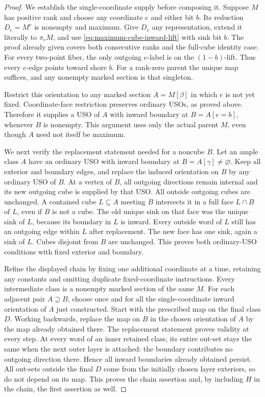 \begin{proof}
We establish the single-coordinate supply before composing it. Suppose
$M$ has positive rank and choose any coordinate $e$ and either bit $b$.
Its reduction $D_e=M^e$ is nonempty and maximum. Give $D_e$ any
representation, extend it literally to $\pi_eM$, and use
\eqref{eq:maximum-cube-inward-lift} with sink bit $b$. The proof already
given covers both consecutive ranks and the full-cube identity case.
For every two-point fiber, the only outgoing $e$-label is on the
$(1-b)$-lift. Thus every $e$-edge points toward shore $b$.
For a rank-zero parent the unique map suffices, and any nonempty marked
section is that singleton.

Restrict this orientation to any marked section $A=M[\beta]$ in which
$e$ is not yet fixed. Coordinate-face restriction preserves ordinary
USOs, as proved above. Therefore it supplies a USO of $A$ with inward
boundary at $B=A[e=b]$, whenever $B$ is nonempty. This argument uses
only the actual parent $M$, even though $A$ need not itself be maximum.

We next verify the replacement statement needed for a noncube $B$.
Let an ample class $A$ have an ordinary USO with inward boundary at
$B=A[\gamma]\ne\varnothing$. Keep all exterior and boundary edges,
and replace the induced orientation on $B$ by any ordinary USO of $B$.
At a vertex of $B$, all outgoing directions remain internal and its
new outgoing cube is supplied by that USO. All outside outgoing cubes
are unchanged. A contained cube $L\subseteq A$ meeting $B$ intersects
it in a full face $L\cap B$ of $L$, even if $B$ is not a cube.
The old unique sink on that face was the unique sink of $L$, because
its boundary in $L$ is inward. Every outside word of $L$ still has
an outgoing edge within $L$ after replacement. The new face has one
sink, again a sink of $L$. Cubes disjoint from $B$ are unchanged.
This proves both ordinary-USO conditions with fixed exterior and boundary.

Refine the displayed chain by fixing one additional coordinate at a
time, retaining any constants and omitting duplicate fixed-coordinate
instructions. Every intermediate class is a nonempty marked section
of the same $M$. For each adjacent pair $A\supseteq B$, choose once
and for all the single-coordinate inward orientation of $A$ just
constructed. Start with the prescribed map on the final class $D$.
Working backwards, replace the map on $B$ in the chosen orientation
of $A$ by the map already obtained there. The replacement statement
proves validity at every step. At every word of an inner retained
class, its entire out-set stays the same when the next outer layer
is attached: the boundary contributes no outgoing direction there.
Hence all inward boundaries already obtained persist. All out-sets outside the final $D$ come from
the initially chosen layer exteriors, so do not depend on its map.
This proves the chain assertion and, by including $H$ in the chain,
the first assertion as well.
\end{proof}

